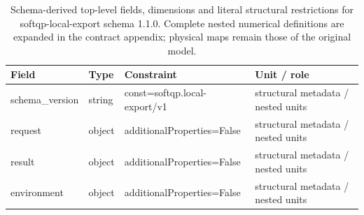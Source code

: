 \begin{table}[htbp]\centering\footnotesize
\caption{Schema-derived top-level fields, dimensions and literal structural restrictions for softqp-local-export schema 1.1.0. Complete nested numerical definitions are expanded in the contract appendix; physical maps remain those of the original model.}\label{tab:contract-softqp-local-export}
\begin{tabularx}{\textwidth}{@{}>{\raggedright\arraybackslash}p{}>{\raggedright\arraybackslash}p{}>{\raggedright\arraybackslash}X>{\raggedright\arraybackslash}X@{}}\toprule
Field & Type & Constraint & Unit / role\\\midrule
schema\_\allowbreak{}version & string & const=\allowbreak{}softqp.\allowbreak{}local-\allowbreak{}export/\allowbreak{}v1 & structural metadata /\allowbreak{} nested units\\
request & object & additionalProperties=\allowbreak{}False & structural metadata /\allowbreak{} nested units\\
result & object & additionalProperties=\allowbreak{}False & structural metadata /\allowbreak{} nested units\\
environment & object & additionalProperties=\allowbreak{}False & structural metadata /\allowbreak{} nested units\\
\bottomrule\end{tabularx}
\end{table}
